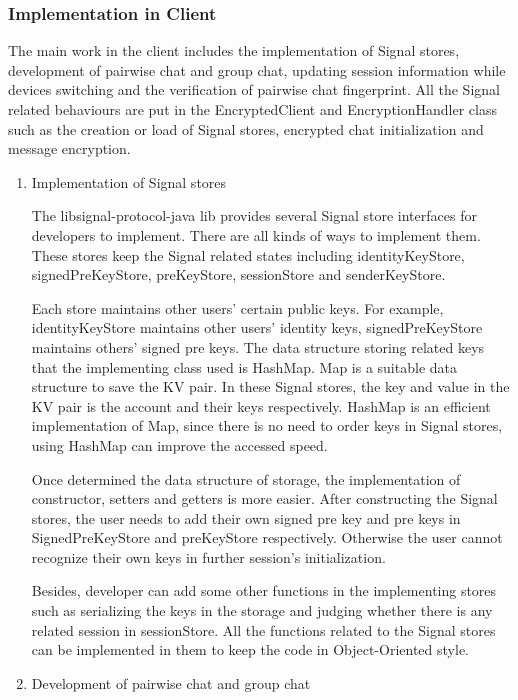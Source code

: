 \subsubsection{Implementation in Client}
The main work in the client includes the implementation of Signal stores, development of pairwise chat and group chat, updating session information while devices switching and the verification of pairwise chat fingerprint. All the Signal related behaviours are put in the EncryptedClient and EncryptionHandler class such as the creation or load of Signal stores, encrypted chat initialization and message encryption.

\begin{enumerate}[label=(\roman*)]
\item Implementation of Signal stores

The libsignal-protocol-java lib provides several Signal store interfaces for developers to implement. There are all kinds of ways to implement them. These stores keep the Signal related states including identityKeyStore, signedPreKeyStore, preKeyStore, sessionStore and senderKeyStore.

Each store maintains other users' certain public keys. For example, identityKeyStore maintains other users' identity keys, signedPreKeyStore maintains others' signed pre keys. The data structure storing related keys that the implementing class used is HashMap. Map is a suitable data structure to save the KV pair. In these Signal stores, the key and value in the KV pair is the account and their keys respectively. HashMap is an efficient implementation of Map, since there is no need to order keys in Signal stores, using HashMap can improve the accessed speed.

Once determined the data structure of storage, the implementation of constructor, setters and getters is more easier. After constructing the Signal stores, the user needs to add their own signed pre key and pre keys in SignedPreKeyStore and preKeyStore respectively. Otherwise the user cannot recognize their own keys in further session's initialization.

Besides, developer can add some other functions in the implementing stores such as serializing the keys in the storage and judging whether there is any related session in sessionStore. All the functions related to the Signal stores can be implemented in them to keep the code in Object-Oriented style.

\item Development of pairwise chat and group chat


\end{enumerate}
